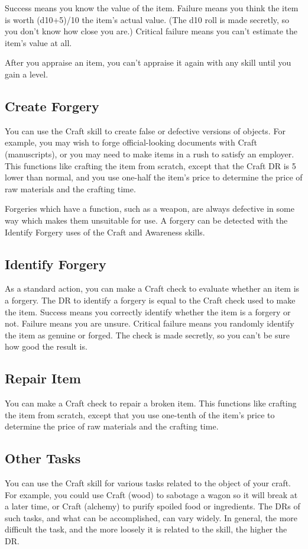         Success means you know the value of the item. Failure means you think the item is worth (d10+5)/10 \x the item's actual value. (The d10 roll is made secretly, so you don't know how close you are.) Critical failure means you can't estimate the item's value at all.

        After you appraise an item, you can't appraise it again with any skill until you gain a level.

    \subsection{Create Forgery}
        You can use the Craft skill to create false or defective versions of objects. For example, you may wish to forge official-looking documents with Craft (manuscripts), or you may need to make items in a rush to satisfy an employer. This functions like crafting the item from scratch, except that the Craft DR is 5 lower than normal, and you use one-half the item's price to determine the price of raw materials and the crafting time.

        Forgeries which have a function, such as a weapon, are always defective in some way which makes them unsuitable for use. A forgery can be detected with the Identify Forgery uses of the Craft and Awareness skills.

    \subsection{Identify Forgery}
        As a standard action, you can make a Craft check to evaluate whether an item is a forgery. The DR to identify a forgery is equal to the Craft check used to make the item. Success means you correctly identify whether the item is a forgery or not. Failure means you are unsure. Critical failure means you randomly identify the item as genuine or forged. The check is made secretly, so you can't be sure how good the result is.

    \subsection{Repair Item}
        You can make a Craft check to repair a broken item. This functions like crafting the item from scratch, except that you use one-tenth of the item's price to determine the price of raw materials and the crafting time.

    \subsection{Other Tasks}
        You can use the Craft skill for various tasks related to the object of your craft. For example, you could use Craft (wood) to sabotage a wagon so it will break at a later time, or Craft (alchemy) to purify spoiled food or ingredients. The DRs of such tasks, and what can be accomplished, can vary widely. In general, the more difficult the task, and the more loosely it is related to the skill, the higher the DR\@.

